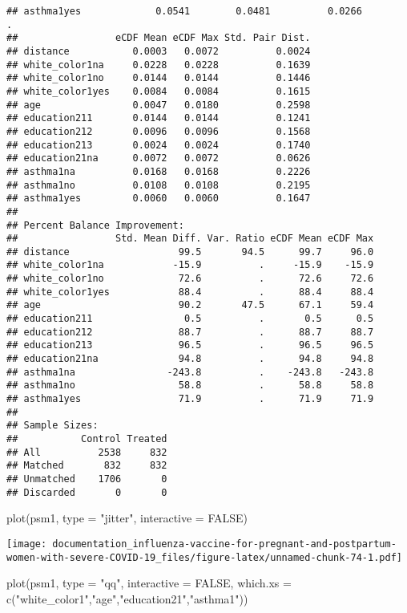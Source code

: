 \documentclass[
]{article}
\newenvironment{Shaded}{\begin{snugshade}}{\end{snugshade}}
\newcommand{\AttributeTok}[1]{\textcolor[rgb]{0.77,0.63,0.00}{#1}}
\newcommand{\ConstantTok}[1]{\textcolor[rgb]{0.00,0.00,0.00}{#1}}
\newcommand{\FunctionTok}[1]{\textcolor[rgb]{0.00,0.00,0.00}{#1}}
\newcommand{\NormalTok}[1]{#1}
\newcommand{\StringTok}[1]{\textcolor[rgb]{0.31,0.60,0.02}{#1}}
\begin{document}
\begin{verbatim}
## asthma1yes             0.0541        0.0481          0.0266          .
##                 eCDF Mean eCDF Max Std. Pair Dist.
## distance           0.0003   0.0072          0.0024
## white_color1na     0.0228   0.0228          0.1639
## white_color1no     0.0144   0.0144          0.1446
## white_color1yes    0.0084   0.0084          0.1615
## age                0.0047   0.0180          0.2598
## education211       0.0144   0.0144          0.1241
## education212       0.0096   0.0096          0.1568
## education213       0.0024   0.0024          0.1740
## education21na      0.0072   0.0072          0.0626
## asthma1na          0.0168   0.0168          0.2226
## asthma1no          0.0108   0.0108          0.2195
## asthma1yes         0.0060   0.0060          0.1647
## 
## Percent Balance Improvement:
##                 Std. Mean Diff. Var. Ratio eCDF Mean eCDF Max
## distance                   99.5       94.5      99.7     96.0
## white_color1na            -15.9          .     -15.9    -15.9
## white_color1no             72.6          .      72.6     72.6
## white_color1yes            88.4          .      88.4     88.4
## age                        90.2       47.5      67.1     59.4
## education211                0.5          .       0.5      0.5
## education212               88.7          .      88.7     88.7
## education213               96.5          .      96.5     96.5
## education21na              94.8          .      94.8     94.8
## asthma1na                -243.8          .    -243.8   -243.8
## asthma1no                  58.8          .      58.8     58.8
## asthma1yes                 71.9          .      71.9     71.9
## 
## Sample Sizes:
##           Control Treated
## All          2538     832
## Matched       832     832
## Unmatched    1706       0
## Discarded       0       0
\end{verbatim}

\begin{Shaded}
\begin{Highlighting}[]
\FunctionTok{plot}\NormalTok{(psm1, }\AttributeTok{type =} \StringTok{"jitter"}\NormalTok{, }\AttributeTok{interactive =} \ConstantTok{FALSE}\NormalTok{)}
\end{Highlighting}
\end{Shaded}

\texttt{[image: documentation\_influenza-vaccine-for-pregnant-and-postpartum-women-with-severe-COVID-19\_files/figure-latex/unnamed-chunk-74-1.pdf]}

\begin{Shaded}
\begin{Highlighting}[]
\FunctionTok{plot}\NormalTok{(psm1, }\AttributeTok{type =} \StringTok{"qq"}\NormalTok{, }\AttributeTok{interactive =} \ConstantTok{FALSE}\NormalTok{,}
     \AttributeTok{which.xs =} \FunctionTok{c}\NormalTok{(}\StringTok{"white\_color1"}\NormalTok{,}\StringTok{"age"}\NormalTok{,}\StringTok{"education21"}\NormalTok{,}\StringTok{"asthma1"}\NormalTok{))}
\end{Highlighting}
\end{Shaded}
\end{document}
